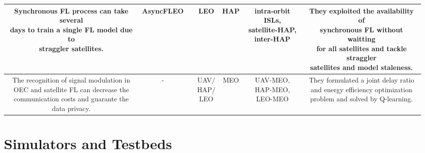 \documentclass[lettersize,journal]{IEEEtran}
\begin{document}
\begin{table*}[htbp]
\begin{tabular}{|c|c|c|c|c|c|c|}
  \makecell[l]{Synchronous FL process can take several\\ days to train a single FL model due to \\straggler satellites.} & AsyncFLEO  & \cite{RN210} &  LEO & HAP & \makecell[c]{intra-orbit ISLs, \\satellite-HAP, \\inter-HAP}& \makecell[l]{They exploited the availability of \\synchronous FL without waitting\\ for all satellites and tackle straggler\\ satellites and model staleness.}   \\ \hline  

  \makecell[l]{The recognition of signal modulation in\\ OEC and satellite FL can decrease the\\ communication costs and guarante the \\ data privacy.} & -  & \cite{RN214} & \makecell[c]{UAV/\\HAP/\\LEO} & MEO &  \makecell[c]{UAV-MEO,\\HAP-MEO,\\LEO-MEO}& \makecell[l]{They formulated a joint delay ratio\\ and energy efficiency optimization\\ problem and solved by Q-learning. }   \\ \hline 

\end{tabular}
\end{table*}

  
\section{Simulators and Testbeds} 
\label{sec4}
\end{document}
